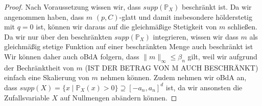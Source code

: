 \begin{proof}
Nach Voraussetzung wissen wir, dass $supp(\mathds{P}_X)$ beschränkt ist. Da wir angenommen haben, dass $m$ $(p,C)$-glatt und damit insbesondere hölderstetig mit $q = 0$ ist, können wir daraus auf die gleichmäßige Stetigkeit von $m$ schließen. Da wir nur über den beschränkten $supp(\mathds{P}_X)$ integrieren, wissen wir dass $m$ als gleichmäßig stetige Funktion auf einer beschränkten Menge auch beschränkt ist Wir können daher auch oBdA folgern, dass $\|m\|_{\infty} \leq \beta_n$ gilt, weil wir aufgrund der Bechränktheit von $m$ (IST DER BETRAG VON M AUCH BESCHRÄNKT) einfach eine Skalierung von $m$ nehmen können. Zudem nehmen wir oBdA an, dass $supp(X) = \{x \mid \mathds{P}_X(x) > 0\} \supseteq [-a_n, a_n]^d$ ist, da wir ansonsten die Zufallsvariable $X$ auf Nullmengen abändern können.


\end{proof}
